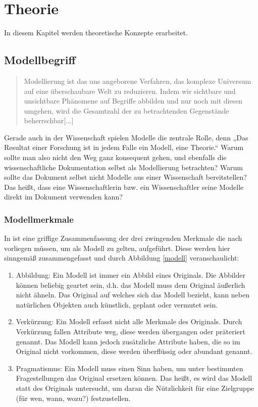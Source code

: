 \chapter{Theorie}\label{}
 
In diesem Kapitel werden theoretische Konzepte erarbeitet.

 
\section{Modellbegriff}\label{}
 
\begin{quote}
 Modellierung ist das uns angeborene Verfahren, das komplexe Universum auf eine überschaubare Welt zu reduzieren. Indem wir sichtbare und unsichtbare Phänomene auf Begriffe abbilden und nur noch mit diesen umgehen, wird die Gesamtzahl der zu betrachtenden Gegenstände beherrschbar[...] \citep[S.~7]{Ludewig}
\end{quote}
 
Gerade auch in der Wissenschaft spielen Modelle die zentrale Rolle, denn „Das Resultat einer Forschung ist in jedem Falle ein Modell, eine Theorie.“ \citep[S.~8]{Ludewig} Warum sollte man also nicht den Weg ganz konsequent gehen, und ebenfalls die wissenschaftliche Dokumentation selbst als Modellierung betrachten? Warum sollte das Dokument selbst nicht Modelle aus einer Wissenschaft bereitstellen? Das heißt, dass eine Wissenschaftlerin bzw. ein Wissenschaftler seine Modelle direkt im Dokument verwenden kann?

 
\subsection{Modellmerkmale}\label{modellmerkmale}
 
In \citep[S.~9]{Ludewig} ist eine griffige Zusammenfassung der drei zwingenden Merkmale die nach \citep{Stachowiak} vorliegen müssen, um als Modell zu gelten, aufgeführt. Diese werden hier sinngemäß zusammengefasst und durch Abbildung \ref{modell} veranschaulicht:

 
\begin{enumerate}

\item Abbildung: Ein Modell ist immer ein Abbild eines Originals. Die Abbilder können beliebig geartet sein, d.h. das Modell muss dem Original äußerlich nicht ähneln. Das Original auf welches sich das Modell bezieht, kann neben natürlichen Objekten auch künstlich, geplant oder vermutet sein.
\item Verkürzung: Ein Modell erfasst nicht alle Merkmale des Originals. Durch Verkürzung fallen Attribute weg, diese werden übergangen oder präteriert genannt. Das Modell kann jedoch zusätzliche Attribute haben, die so im Original nicht vorkommen, diese werden überflüssig oder abundant genannt.
\item Pragmatismus: Ein Modell muss einen Sinn haben, um unter bestimmten Fragestellungen das Original ersetzen können. Das heißt, es wird das Modell statt des Originals untersucht, um daran die Nützlichkeit für eine Zielgruppe (für wen, wann, wozu?) festzustellen.
\end{enumerate}
 
